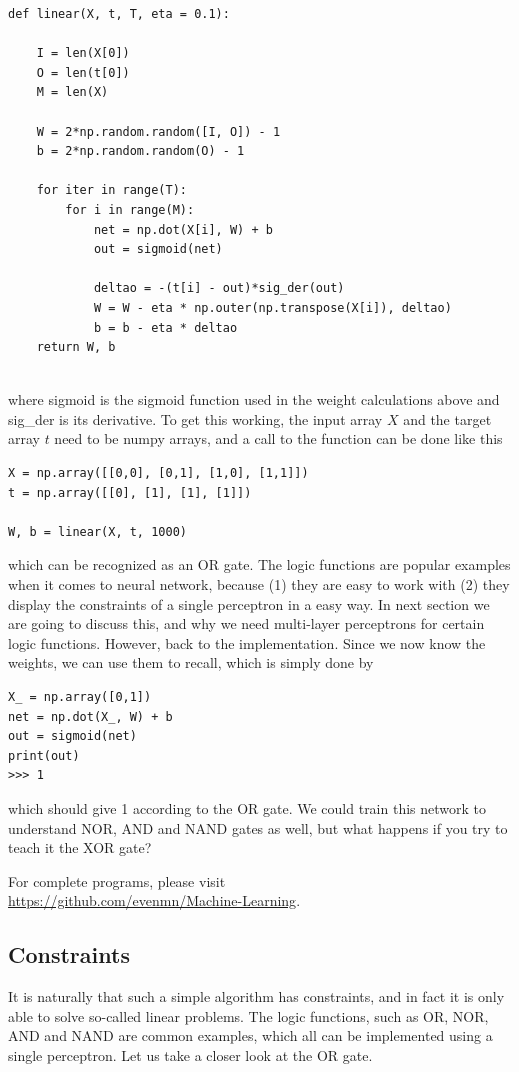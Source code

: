 \documentclass[norsk,a4paper,12pt]{article}
\begin{document}
\lstset{basicstyle=\scriptsize}
\begin{lstlisting}
def linear(X, t, T, eta = 0.1):
    
    I = len(X[0])
    O = len(t[0])
    M = len(X)
    
    W = 2*np.random.random([I, O]) - 1
    b = 2*np.random.random(O) - 1

    for iter in range(T):
        for i in range(M):
            net = np.dot(X[i], W) + b
            out = sigmoid(net)

            deltao = -(t[i] - out)*sig_der(out)
            W = W - eta * np.outer(np.transpose(X[i]), deltao)
            b = b - eta * deltao
    return W, b
    
\end{lstlisting}
where sigmoid is the sigmoid function used in the weight calculations above and sig\_der is its derivative. To get this working, the input array $X$ and the target array $t$ need to be numpy arrays, and a call to the function can be done like this
\begin{lstlisting}
X = np.array([[0,0], [0,1], [1,0], [1,1]])
t = np.array([[0], [1], [1], [1]])

W, b = linear(X, t, 1000)
\end{lstlisting}
which can be recognized as an OR gate. The logic functions are popular examples when it comes to neural network, because (1) they are easy to work with (2) they display the constraints of a single perceptron in a easy way. In next section we are going to discuss this, and why we need multi-layer perceptrons for certain logic functions. However, back to the implementation. Since we now know the weights, we can use them to recall, which is simply done by
\begin{lstlisting}
X_ = np.array([0,1])
net = np.dot(X_, W) + b
out = sigmoid(net)
print(out)
>>> 1
\end{lstlisting}
which should give 1 according to the OR gate. We could train this network to understand NOR, AND and NAND gates as well, but what happens if you try to teach it the XOR gate? 

For complete programs, please visit \\ \url{https://github.com/evenmn/Machine-Learning}.

\subsection{Constraints}
It is naturally that such a simple algorithm has constraints, and in fact it is only able to solve so-called linear problems. The logic functions, such as OR, NOR, AND and NAND are common examples, which all can be implemented using a single perceptron. Let us take a closer look at the OR gate.
\end{document}
